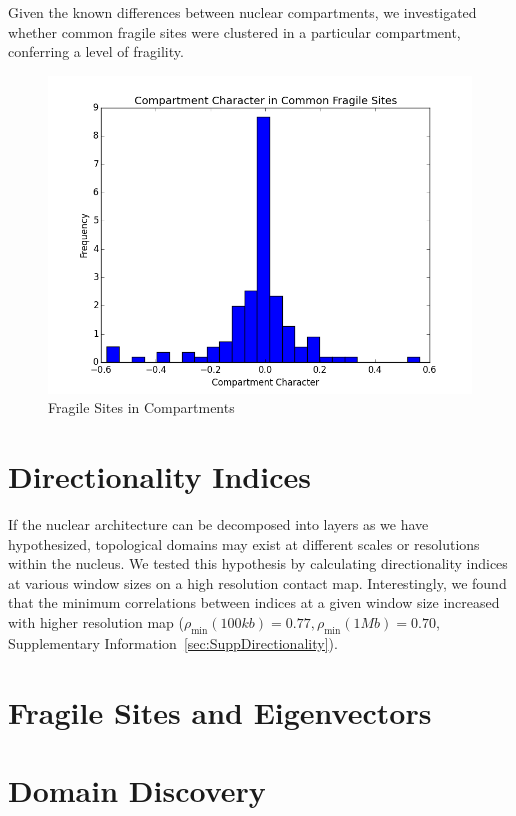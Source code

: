 Given the known differences between nuclear compartments, we investigated whether common fragile sites were clustered in a particular
compartment, conferring a level of fragility. 

\begin{figure}[thp]
  \centering
  \caption{Fragile Sites in Compartments}\label{fig:compartmentCfs}
  \includegraphics[width=\textwidth]{./figures/results/cfs.png}
\end{figure}



\section*{Directionality Indices}

If the nuclear architecture can be decomposed into layers as we have hypothesized, topological domains may exist at different
scales or resolutions within the nucleus.  We tested this hypothesis by calculating directionality indices at various window sizes
on a high resolution contact map.  Interestingly, we found that the minimum correlations between indices at a given window size increased
with higher resolution map ($\rho_{\min}(100kb) = 0.77, \rho_{\min}(1Mb) = 0.70$, Supplementary Information~\ref{sec:SuppDirectionality}).

\section*{Fragile Sites and Eigenvectors}

\section*{Domain Discovery}

